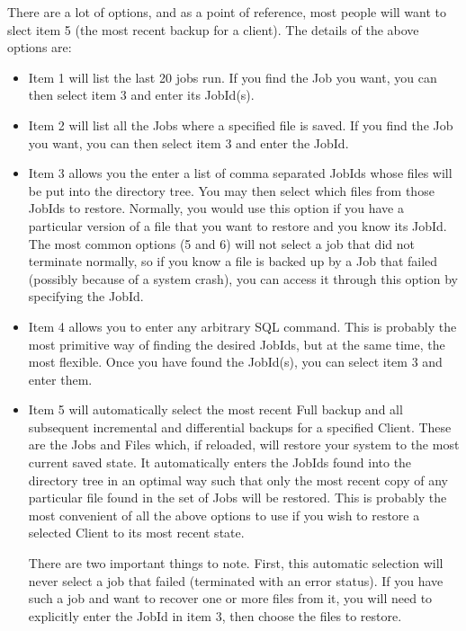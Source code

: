 There are a lot of options, and as a point of reference, most people will
want to slect item 5 (the most recent backup for a client). The details
of the above options are:

\begin{itemize}
\item Item 1 will list the last 20 jobs run. If you find the Job you want,
   you can then select item 3 and enter its JobId(s).

\item Item 2 will list all the Jobs where a specified file is saved.  If you
   find the Job you want, you can then select item 3 and enter the JobId.

\item Item 3 allows you the enter a list of comma separated JobIds whose 
   files will be put into the directory tree. You may then select which
   files from those JobIds to restore. Normally, you would use this option
   if you have a particular version of a file that you want to restore and
   you know its JobId. The most common options (5 and 6) will not select
   a job that did not terminate normally, so if you know a file is 
   backed up by a Job that failed (possibly because of a system crash), you
   can access it through this option by specifying the JobId. 

\item Item 4 allows you to enter any arbitrary SQL command.  This is
   probably the most primitive way of finding the desired JobIds, but at
   the same time, the most flexible.  Once you have found the JobId(s), you
   can select item 3 and enter them.

\item Item 5 will automatically select the most recent Full backup and all
   subsequent incremental and differential backups for a specified Client.
   These are the Jobs and Files which, if reloaded, will restore your
   system to the most current saved state.  It automatically enters the
   JobIds found into the directory tree in an optimal way such that only
   the most recent copy of any particular file found in the set of Jobs
   will be restored.  This is probably the most convenient of all the above
   options to use if you wish to restore a selected Client to its most
   recent state.

   There are two important things to note. First, this automatic selection
   will never select a job that failed (terminated with an error status).
   If you have such a job and want to recover one or more files from it,
   you will need to explicitly enter the JobId in item 3, then choose the
   files to restore.


\end{itemize}
